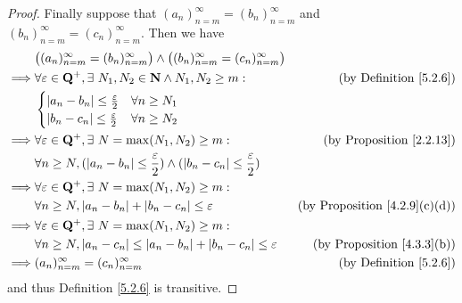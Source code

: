\begin{proof}
    Finally suppose that \((a_n)_{n = m}^\infty = (b_n)_{n = m}^\infty\) and \((b_n)_{n = m}^\infty = (c_n)_{n = m}^\infty\).
    Then we have
    \begin{align*}
                 & \big((a_n)_{n = m}^\infty = (b_n)_{n = m}^\infty\big) \land \big((b_n)_{n = m}^\infty = (c_n)_{n = m}^\infty\big)                                             \\
        \implies & \forall \varepsilon \in \mathbf{Q}^+, \exists\ N_1, N_2 \in \mathbf{N} \land N_1, N_2 \geq m:                                     & \text{(by Definition \ref{5.2.6})}        \\
                 & \begin{cases}
                       \left\lvert a_n - b_n\right\rvert \leq \frac{\varepsilon}{2} & \forall n \geq N_1 \\
                       \left\lvert b_n - c_n\right\rvert \leq \frac{\varepsilon}{2} & \forall n \geq N_2 \\
                   \end{cases}                                                                                               \\
        \implies & \forall \varepsilon \in \mathbf{Q}^+, \exists\ N = \max(N_1, N_2) \geq m:                                                 & \text{(by Proposition \ref{2.2.13})}      \\
                 & \forall n \geq N, (\left\lvert a_n - b_n\right\rvert \leq \frac{\varepsilon}{2}) \land (\left\lvert b_n - c_n\right\rvert \leq \frac{\varepsilon}{2})                                             \\
        \implies & \forall \varepsilon \in \mathbf{Q}^+, \exists\ N = \max(N_1, N_2) \geq m:                                                                                             \\
                 & \forall n \geq N, \left\lvert a_n - b_n\right\rvert + \left\lvert b_n - c_n\right\rvert \leq \varepsilon                                              & \text{(by Proposition \ref{4.2.9}(c)(d))} \\
        \implies & \forall \varepsilon \in \mathbf{Q}^+, \exists\ N = \max(N_1, N_2) \geq m:                                                                                             \\
                 & \forall n \geq N, \left\lvert a_n - c_n\right\rvert \leq \left\lvert a_n - b_n\right\rvert + \left\lvert b_n - c_n\right\rvert \leq \varepsilon                         & \text{(by Proposition \ref{4.3.3}(b))}    \\
        \implies & (a_n)_{n = m}^\infty = (c_n)_{n = m}^\infty                                                                       & \text{(by Definition \ref{5.2.6})}
    \end{align*}
    and thus Definition \ref{5.2.6} is transitive.
\end{proof}

